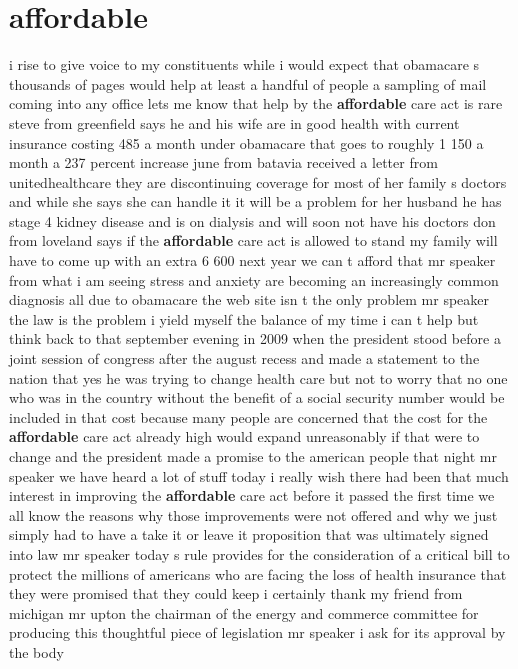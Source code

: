 \documentclass{article}
\begin{document}
\section*{affordable}
i rise to give voice to my constituents while i would expect that obamacare s thousands of pages would help at least a handful of people a sampling of mail coming into any office lets me know that help by the {\bf \color{red} affordable} care act is rare steve from greenfield says he and his wife are in good health with current insurance costing 485 a month under obamacare that goes to roughly 1 150 a month a 237 percent increase june from batavia received a letter from unitedhealthcare they are discontinuing coverage for most of her family s doctors and while she says she can handle it it will be a problem for her husband he has stage 4 kidney disease and is on dialysis and will soon not have his doctors don from loveland says if the {\bf \color{red} affordable} care act is allowed to stand my family will have to come up with an extra 6 600 next year we can t afford that mr speaker from what i am seeing stress and anxiety are becoming an increasingly common diagnosis all due to obamacare the web site isn t the only problem mr speaker the law is the problem
\vspace{8mm}
i yield myself the balance of my time i can t help but think back to that september evening in 2009 when the president stood before a joint session of congress after the august recess and made a statement to the nation that yes he was trying to change health care but not to worry that no one who was in the country without the benefit of a social security number would be included in that cost because many people are concerned that the cost for the {\bf \color{red} affordable} care act already high would expand unreasonably if that were to change and the president made a promise to the american people that night mr speaker we have heard a lot of stuff today i really wish there had been that much interest in improving the {\bf \color{red} affordable} care act before it passed the first time we all know the reasons why those improvements were not offered and why we just simply had to have a take it or leave it proposition that was ultimately signed into law mr speaker today s rule provides for the consideration of a critical bill to protect the millions of americans who are facing the loss of health insurance that they were promised that they could keep i certainly thank my friend from michigan mr upton the chairman of the energy and commerce committee for producing this thoughtful piece of legislation mr speaker i ask for its approval by the body
\end{document}
